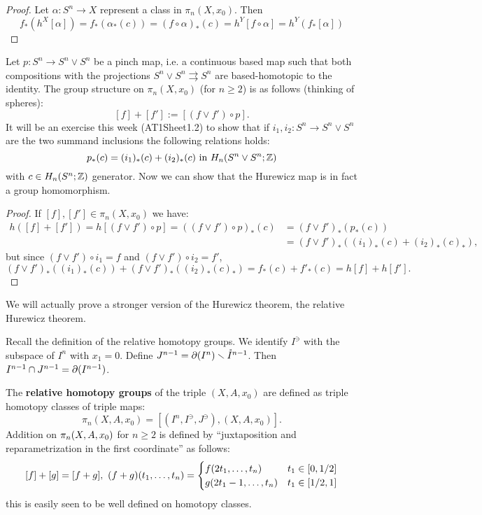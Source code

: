 \begin{proof}
Let $\alpha:S^n\to X$ represent a class in $\pi_n(X,x_0)$. Then
\[f_*(h^X[\alpha])=f_*(\alpha_*(c))=(f\circ\alpha)_*(c)=h^Y[f\circ\alpha]=h^Y(f_*[\alpha])\]
\end{proof}

 Let $p:S^n\to S^n\vee S^n$ be a pinch map, i.e. a continuous based map such that both compositions with the projections $S^n\vee S^n\rightrightarrows S^n$ are based-homotopic to the identity. The group structure on $\pi_n(X,x_0)$ (for $n\geq2$) is as follows (thinking of spheres):
\[[f]+[f']:=[(f\vee f')\circ p].\]
It will be an exercise this week (AT1Sheet1.2) to show that if $i_1,i_2:S^n\to S^n\vee S^n$ are the two summand inclusions the following relations holds:
\[p_*(c)=(i_1)_*(c)+(i_2)_*(c) \text{ in } H_n(S^n\vee S^n;{\mathbb Z})\]
with $c\in H_n(S^n;{\mathbb Z})$ generator.
Now we can show that the Hurewicz map is in fact a group homomorphism.
\begin{proof}
If $[f],[f']\in\pi_n(X,x_0)$ we have:
\begin{align*}
    h([f]+[f'])=h[(f\vee f')\circ p]=((f\vee f')\circ p)_*(c)&=(f\vee f')_*(p_*(c))\\
    &=(f\vee f')_*((i_1)_*(c)+(i_2)_*(c)_*),
\end{align*}
but since $(f\vee f')\circ i_1=f$ and $(f\vee f')\circ i_2=f'$,
\[(f\vee f')_*((i_1)_*(c))+(f\vee f')_*((i_2)_*(c)_*)=f_*(c)+f'_*(c)=h[f]+h[f'].\]
\end{proof}

We will actually prove a stronger version of the Hurewicz theorem, the relative Hurewicz theorem.

Recall the definition of the relative homotopy groups. We identify $I^\ni$ with the subspace of $I^n$ with $x_1=0$. Define $J^{n-1}=\partial (I^n)\smallsetminus\mathring{I}^{n-1}$. Then $I^{n-1}\cap J^{n-1}=\partial(I^{n-1})$.

The \textbf{relative homotopy groups} of the triple $(X,A,x_0)$ are defined as triple homotopy classes of triple maps:
\[\pi_n(X,A,x_0)=[(I^n, I^\ni, J^\ni),(X,A,x_0)].\]
Addition on $\pi_n(X,A,x_0)$ for $n\geq 2$ is defined by \enquote{juxtaposition and reparametrization in the first coordinate} as follows:
\[[f]+[g]=[f+g],\ (f+g)(\nn{t}{n})=\begin{cases}f(2t_1,\dots,t_n) & t_1\in[0,1/2] \\ g(2t_1-1,\dots,t_n) & t_1\in[1/2,1]\end{cases}\]
this is easily seen to be well defined on homotopy classes.

